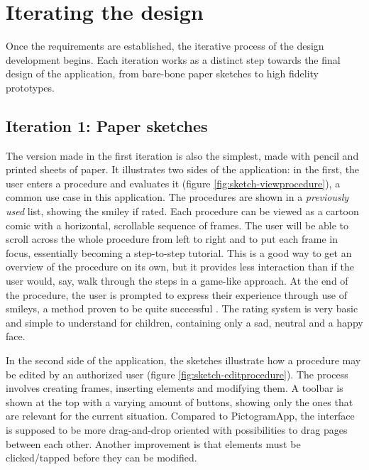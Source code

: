 \chapter{Iterating the design}
\label{ch:iterating}

Once the requirements are established, the iterative process of the design development begins. Each iteration works as a distinct step towards the final design of the application, from bare-bone paper sketches to high fidelity prototypes.

\section{Iteration 1: Paper sketches}
\label{sec:iteration1}

The version made in the first iteration is also the simplest, made with pencil and printed sheets of paper. It illustrates two sides of the application: in the first, the user enters a procedure and evaluates it (figure \ref{fig:sketch-viewprocedure}), a common use case in this application. The procedures are shown in a \emph{previously used} list, showing the smiley if rated. Each procedure can be viewed as a cartoon comic with a horizontal, scrollable sequence of frames. The user will be able to scroll across the whole procedure from left to right and to put each frame in focus, essentially becoming a step-to-step tutorial. This is a good way to get an overview of the procedure on its own, but it provides less interaction than if the user would, say, walk through the steps in a game-like approach. At the end of the procedure, the user is prompted to express their experience through use of smileys, a method proven to be quite successful \parencite{stalberg2016}. The rating system is very basic and simple to understand for children, containing only a sad, neutral and a happy face.

In the second side of the application, the sketches illustrate how a procedure may be edited by an authorized user (figure \ref{fig:sketch-editprocedure}). The process involves creating frames, inserting elements and modifying them. A toolbar is shown at the top with a varying amount of buttons, showing only the ones that are relevant for the current situation. Compared to PictogramApp, the interface is supposed to be more drag-and-drop oriented with possibilities to drag pages between each other. Another improvement is that elements must be clicked/tapped before they can be modified.

